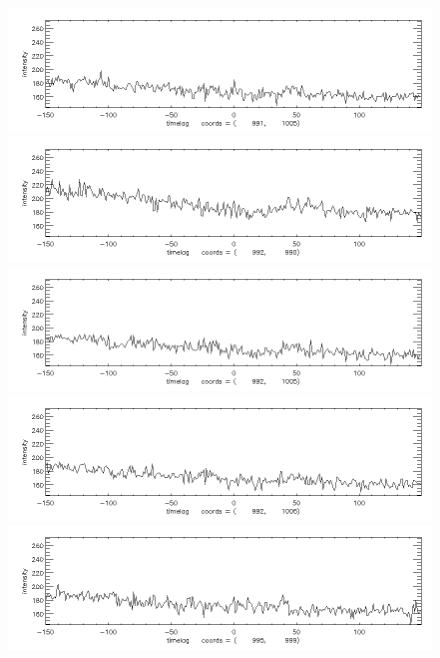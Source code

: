 \documentclass[12pt]{article}
\begin{document}
    

\begin{figure}[here] 
\centering
\includegraphics[width=7in]{lc01.png}
\includegraphics[width=7in]{lc02.png}
\includegraphics[width=7in]{lc03.png}
\includegraphics[width=7in]{lc04.png}
\includegraphics[width=7in]{lc05.png}
\end{figure}
\newpage
\end{document}
